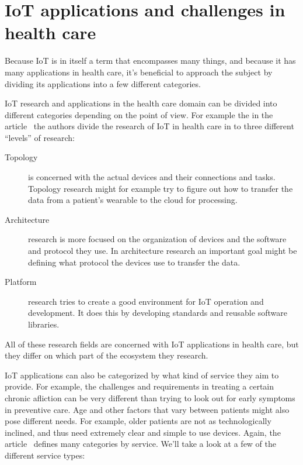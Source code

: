 \section{IoT applications and challenges in health care}
\label{sec:iot-health}

Because IoT is in itself a term that encompasses many things, and because it
has many applications in health care, it's beneficial to approach the subject
by dividing its applications into a few different categories.

IoT research and applications in the health care domain can be divided into
different categories depending on the point of view. For example the in the
article~\cite{Islam2015} the authors divide the research of IoT in health care
in to three different ``levels'' of research:

\begin{description}
  \item[Topology] is concerned with the actual devices and their connections
    and tasks. Topology research might for example try to figure out how to
    transfer the data from a patient's wearable to the cloud for processing.

  \item[Architecture] research is more focused on the organization of devices
    and the software and protocol they use. In architecture research an
    important goal might be defining what protocol the devices use to transfer
    the data.

  \item[Platform] research tries to create a good environment for IoT
    operation and development. It does this by developing standards and
    reusable software libraries.

\end{description}

All of these research fields are concerned with IoT applications in health
care, but they differ on which part of the ecosystem they research.

IoT applications can also be categorized by what kind of service they aim to
provide. For example, the challenges and requirements in treating a certain
chronic afliction can be very different than trying to look out for early
symptoms in preventive care. Age and other factors that vary between patients
might also pose different needs. For example, older patients are not as
technologically inclined, and thus need extremely clear and simple to use
devices. Again, the article~\cite{Islam2015} defines many categories by
service. We'll take a look at a few of the different service types:

